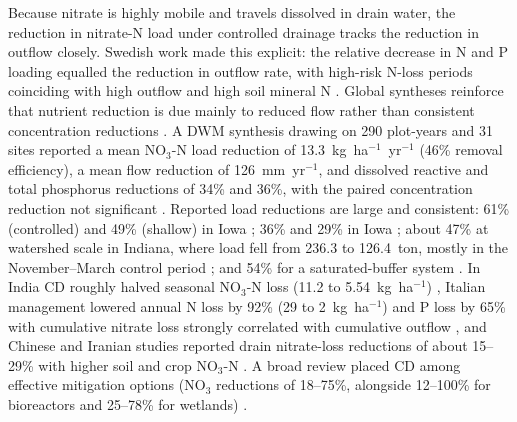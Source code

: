 \documentclass[11pt]{article}
\begin{document}
Because nitrate is highly mobile and travels dissolved in drain water, the
reduction in nitrate-N load under controlled drainage tracks the reduction in
outflow closely. Swedish work made this explicit: the relative decrease in N and
P loading equalled the reduction in outflow rate, with high-risk N-loss periods
coinciding with high outflow and high soil mineral N \parencite{Wesström2007}.
Global syntheses reinforce that nutrient reduction is due mainly to reduced flow
rather than consistent concentration reductions
\parencite{Frankenberger2024,Wang2020c}. A DWM synthesis drawing on 290
plot-years and 31 sites reported a mean NO$_3$-N load reduction of
13.3~kg~ha$^{-1}$~yr$^{-1}$ (46\% removal efficiency), a mean flow reduction of
126~mm~yr$^{-1}$, and dissolved reactive and total phosphorus reductions of 34\%
and 36\%, with the paired concentration reduction not significant
\parencite{Frankenberger2024}. Reported load reductions are large and
consistent: 61\% (controlled) and 49\% (shallow) in Iowa \parencite{Schott2017};
36\% and 29\% in Iowa \parencite{Helmers2012}; about 47\% at watershed scale in
Indiana, where load fell from 236.3 to 126.4~ton, mostly in the
November--March control period \parencite{Ale2012}; and 54\% for a
saturated-buffer system \parencite{Ghane2025}. In India CD roughly halved
seasonal NO$_3$-N loss (11.2 to 5.54~kg~ha$^{-1}$) \parencite{Karegoudar2019},
Italian management lowered annual N loss by 92\% (29 to 2~kg~ha$^{-1}$) and P
loss by 65\% with cumulative nitrate loss strongly correlated with cumulative
outflow \parencite{Tolomio2018}, and Chinese and Iranian studies reported drain
nitrate-loss reductions of about 15--29\% with higher soil and crop NO$_3$-N
\parencite{Dou2021,Dou2023,Jouni2018}. A broad review placed CD among effective
mitigation options (NO$_3$ reductions of 18--75\%, alongside 12--100\% for
bioreactors and 25--78\% for wetlands) \parencite{Castellano2019}.
\end{document}
